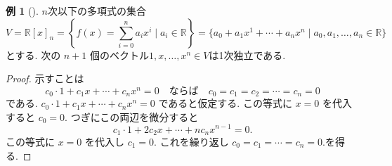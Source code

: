 \documentclass[dvipdfmx,a4paper,11pt]{article} %
\newcommand{\R}{\mathbb{R}}
\theoremstyle{definition}
\newtheorem{ex}[thm]{例}
\begin{document}
\begin{ex}[{\cite[例2]{M}}]%
$n$次以下の多項式の集合
$$
V=\mathbb{R}[x]_n
=
\left\{ f(x) = \sum_{i=0}^{n} a_i x^i \mid a_i\in \R\right\}
=
\{a_0 + a_1 x^1 + \cdots + a_n x^n\mid a_0, a_1, \ldots, a_n\in \R 
\}
$$ とする. 次の $n+1$ 個のベクトル$1,x,\ldots,x^n \in V$は1次独立である.

\begin{proof}
示すことは
$$
c_0\cdot1+c_1x+\cdots+c_nx^n=0 
\quad \text{ならば} \quad
c_0=c_1= c_2=\cdots=c_n=0
$$
である. 
\(
c_0\cdot1+c_1x+\cdots+c_nx^n=0
\)
であると仮定する. この等式に $x=0$ を代入すると $c_0=0$. つぎにこの両辺を微分すると
\[
c_1\cdot1+2c_2x+\cdots+nc_nx^{n-1}=0.
\]
この等式に $x=0$ を代入し $c_1=0$. これを繰り返し
\(
c_0=c_1=\cdots=c_n=0.
\)を得る. 
\end{proof}
\end{ex}
\end{document}
